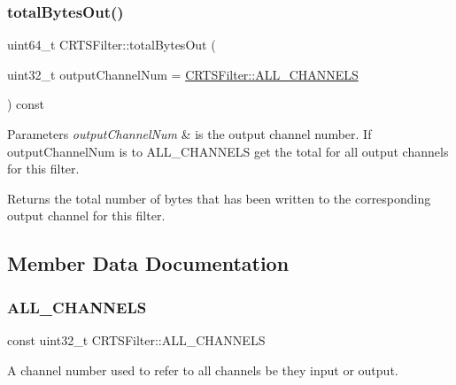 \subsubsection{\texorpdfstring{total\+Bytes\+Out()}{totalBytesOut()}}
{\footnotesize\ttfamily uint64\+\_\+t C\+R\+T\+S\+Filter\+::total\+Bytes\+Out (\begin{DoxyParamCaption}\item[{uint32\+\_\+t}]{output\+Channel\+Num = {\ttfamily \hyperlink{classCRTSFilter_a9ea354654e8e2e8ce3bff293cc35fafe}{C\+R\+T\+S\+Filter\+::\+A\+L\+L\+\_\+\+C\+H\+A\+N\+N\+E\+LS}} }\end{DoxyParamCaption}) const\hspace{0.3cm}{\ttfamily [protected]}}


\begin{DoxyParams}{Parameters}
{\em output\+Channel\+Num} & is the output channel number. If {\ttfamily output\+Channel\+Num} is to {\ttfamily A\+L\+L\+\_\+\+C\+H\+A\+N\+N\+E\+LS} get the total for all output channels for this filter.\\
\hline
\end{DoxyParams}
\begin{DoxyReturn}{Returns}
the total number of bytes that has been written to the corresponding output channel for this filter. 
\end{DoxyReturn}


\subsection{Member Data Documentation}
\mbox{\label{classCRTSFilter_a9ea354654e8e2e8ce3bff293cc35fafe}} 
\subsubsection{\texorpdfstring{A\+L\+L\+\_\+\+C\+H\+A\+N\+N\+E\+LS}{ALL\_CHANNELS}}
{\footnotesize\ttfamily const uint32\+\_\+t C\+R\+T\+S\+Filter\+::\+A\+L\+L\+\_\+\+C\+H\+A\+N\+N\+E\+LS\hspace{0.3cm}{\ttfamily [static]}}

A channel number used to refer to all channels be they input or output.

